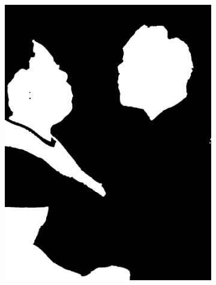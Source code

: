 \begin{figure}[h]
{\begin{subfigure}[b]{0.23\textwidth}
         \includegraphics[width=\textwidth]{images/results/cross_st/mike_med_dark_y.png}
     \end{subfigure}
    \hfill
     \begin{subfigure}[b]{0.23\textwidth}
         \centering

\end{subfigure}}
\end{figure}
